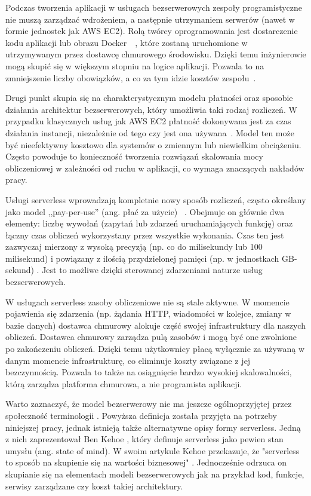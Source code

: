 Podczas tworzenia aplikacji w usługach bezserwerowych zespoły programistyczne nie muszą zarządzać wdrożeniem, a następnie utrzymaniem serwerów (nawet w formie jednostek jak AWS EC2). 
Rolą twórcy oprogramowania jest dostarczenie kodu aplikacji lub obrazu Docker~\cite{awsLambdaDocs}~\cite{awsEcsDevGuide}, które zostaną uruchomione w utrzymywanym przez dostawcę chmurowego środowisku. 
Dzięki temu inżynierowie mogą skupić się w większym stopniu na logice aplikacji. 
Pozwala to na zmniejszenie liczby obowiązków, a co za tym idzie kosztów zespołu~\cite{riseOfThePlanetOfServerlessComputing}. 

Drugi punkt skupia się na charakterystycznym modelu płatności oraz sposobie działania architektur bezserwerowych, który umożliwia taki rodzaj rozliczeń. 
W przypadku klasycznych usług jak AWS EC2 płatność dokonywana jest za czas działania instancji, niezależnie od tego czy jest ona używana~\cite{awsEc2Guide}. 
Model ten może być nieefektywny kosztowo dla systemów o zmiennym lub niewielkim obciążeniu. 
Często powoduje to konieczność tworzenia rozwiązań skalowania mocy obliczeniowej w zależności od ruchu w aplikacji, co wymaga znaczących nakładów pracy.

Usługi serverless wprowadzają kompletnie nowy sposób rozliczeń, często określany jako model ,,pay-per-use'' (ang. płać za użycie) ~\cite{ServerlessApplicationsWhyWhenAndHow}.
Obejmuje on głównie dwa elementy: liczbę wywołań (zapytań lub zdarzeń uruchamiających funkcję) oraz łączny czas obliczeń wykorzystany przez wszystkie wykonania. 
Czas ten jest zazwyczaj mierzony z wysoką precyzją (np. co do milisekundy lub 100 milisekund) i powiązany z ilością przydzielonej pamięci (np. w jednostkach GB-sekund) \cite{awsLambdaDocs}.
Jest to możliwe dzięki sterowanej zdarzeniami naturze usług bezserwerowych.

W usługach serverless zasoby obliczeniowe nie są stale aktywne. 
W momencie pojawienia się zdarzenia (np. żądania HTTP, wiadomości w kolejce, zmiany w bazie danych) dostawca chmurowy alokuje część swojej infrastruktury dla naszych obliczeń.
Dostawca chmurowy zarządza pulą zasobów i mogą być one zwolnione po zakończeniu obliczeń.
Dzięki temu użytkownicy płacą wyłącznie za używaną w danym momencie infrastrukturę, co eliminuje koszty związane z jej bezczynnością.
Pozwala to także na osiągnięcie bardzo wysokiej skalowalności, którą zarządza platforma chmurowa, a nie programista aplikacji.

Warto zaznaczyć, że model bezserwerowy nie ma jeszcze ogólnoprzyjętej przez społeczność terminologii \cite{SpecRgCloudGroupVisionOnThePerformanceChallengesOfFaas}.
Powyższa definicja została przyjęta na potrzeby niniejszej pracy, jednak istnieją także alternatywne opisy formy serverless.
Jedną z nich zaprezentował Ben Kehoe \cite{kehoe_serverless_2018}, który definuje serverless jako pewien stan umysłu (ang. state of mind).
W swoim artykule Kehoe przekazuje, że  "serverless to sposób na skupienie się na wartości biznesowej" \cite{kehoe_serverless_2018}.
Jednocześnie odrzuca on skupianie się na elementach modeli bezserwerowych jak na przykład kod, funkcje, serwisy zarządzane czy koszt takiej architektury.

